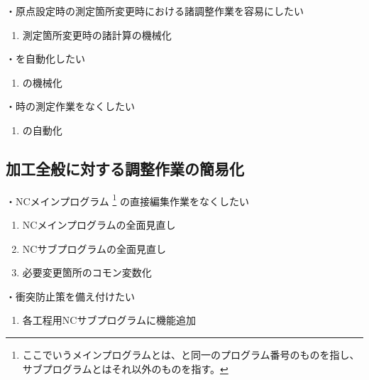 ・原点設定時の測定箇所変更時における諸調整作業を容易にしたい
\begin{enumerate}[label=\sarrow]
\item 測定箇所変更時の諸計算の機械化
\end{enumerate}
・\CenterlineEndFaceDifMeasurement を自動化したい
\begin{enumerate}[label=\sarrow]
\item \CenterlineEndFaceDifMeasurement の機械化
\end{enumerate}
・\CurvedOutcutMilling 時の測定作業をなくしたい
\begin{enumerate}[label=\sarrow]
\item \CurvedOutcutMilling の自動化
\end{enumerate}



\clearpage


\subsection{加工全般に対する調整作業の簡易化}
・NCメインプログラム
\footnote{ここでいうメインプログラムとは、\DrawingNumber と同一のプログラム番号のものを指し、サブプログラムとはそれ以外のものを指す。}
の直接編集作業をなくしたい
\begin{enumerate}[label=\sarrow]
\item {}NCメインプログラムの全面見直し
\item {}NCサブプログラムの全面見直し
\item 必要変更箇所のコモン変数化
\end{enumerate}
・衝突防止策を備え付けたい
\begin{enumerate}[label=\sarrow]
\item 各工程用NCサブプログラムに機能追加
\end{enumerate}



